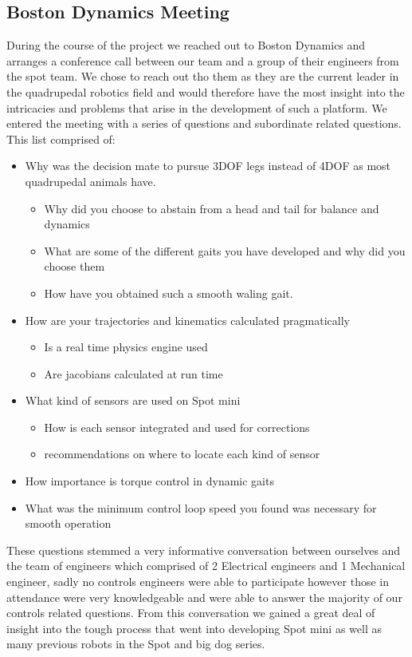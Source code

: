 \subsection{Boston Dynamics Meeting} %
    During the course of the project we reached out to Boston Dynamics and arranges a conference call between our team and a group of their engineers from the spot team. We chose to reach out tho them as they are the current leader in the quadrupedal robotics field and would therefore have the most insight into the intricacies and problems that arise in the development of such a platform. We entered the meeting with a series of questions and subordinate related questions. This list comprised of:
    \begin{itemize}
        \item Why was the decision mate to pursue 3DOF legs instead of 4DOF as most quadrupedal animals have. 
        \begin{itemize}
            \item Why did you choose to abstain from a head and tail for balance and dynamics
            \item What are some of the different gaits you have developed and why did you choose them
            \item How have you obtained such a smooth waling gait.
        \end{itemize}
        \item How are your trajectories and kinematics calculated pragmatically
            \begin{itemize}
                \item Is a real time physics engine used
                \item Are jacobians calculated at run time
            \end{itemize}
        \item What kind of sensors are used on Spot mini
            \begin{itemize}
                \item How is each sensor integrated and used for corrections
                \item recommendations on where to locate each kind of sensor
            \end{itemize}
        \item How importance is torque control in dynamic gaits
        \item What was the minimum control loop speed you found was necessary for smooth operation
    \end{itemize}
These questions stemmed a very informative conversation between ourselves and the team of engineers which comprised of 2 Electrical engineers and 1 Mechanical engineer, sadly no controls engineers were able to participate however those in attendance were very knowledgeable and were able to answer the majority of our controls related questions. From this conversation we gained a great deal of insight into the tough process that went into developing Spot mini as well as many previous robots in the Spot and big dog series.  

